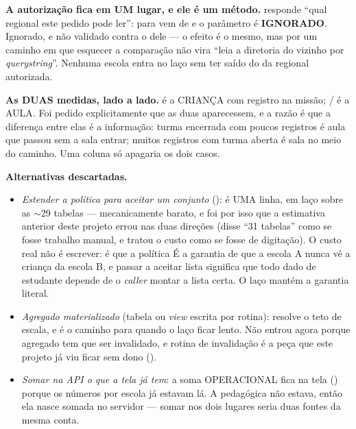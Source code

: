 \textbf{A autorização fica em UM lugar, e ele é um método.}
 responde \enquote{qual regional este pedido pode ler}:
para  vem de  e o parâmetro
 é \textbf{IGNORADO}. Ignorado, e não validado contra o dele ---
o efeito é o mesmo, mas por um caminho em que esquecer a comparação não vira
\enquote{leia a diretoria do vizinho por \emph{querystring}}. Nenhuma escola
entra no laço sem ter saído do  da regional autorizada.

\textbf{As DUAS medidas, lado a lado.}  é a CRIANÇA com registro
na missão; / é a AULA. Foi pedido
explicitamente que as duas aparecessem, e a razão é que a diferença entre elas é
a informação: turma encerrada com poucos registros é aula que passou sem a sala
entrar; muitos registros com turma aberta é sala no meio do caminho. Uma coluna
só apagaria os dois casos.

\textbf{Alternativas descartadas.}
\begin{itemize}
  \item \emph{Estender a política para aceitar um conjunto}
    (): é UMA linha, em laço sobre as $\sim$29 tabelas
    --- mecanicamente barato, e foi por isso que a estimativa anterior deste
    projeto errou nas duas direções (disse \enquote{31 tabelas} como se fosse
    trabalho manual, e tratou o custo como se fosse de digitação). O custo real
    não é escrever: é que a política É a garantia de que a escola A nunca vê a
    criança da escola B, e passar a aceitar lista significa que todo dado de
    estudante depende de o \emph{caller} montar a lista certa. O laço mantém a
    garantia literal.
  \item \emph{Agregado materializado} (tabela ou \emph{view} escrita por rotina):
    resolve o teto de escala, e é o caminho para quando o laço ficar lento. Não
    entrou agora porque agregado tem que ser invalidado, e rotina de
    invalidação é a peça que este projeto já viu ficar sem dono
    ().
  \item \emph{Somar na API o que a tela já tem}: a soma OPERACIONAL fica na tela
    () porque os números por escola já estavam lá. A pedagógica não
    estava, então ela nasce somada no servidor --- somar nos dois lugares seria
    duas fontes da mesma conta.
\end{itemize}

